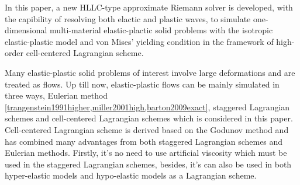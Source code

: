 \documentclass{article}
\numberwithin{equation}{section}
\numberwithin{table}{section}
\begin{document}
In this paper, a new HLLC-type approximate Riemann solver is developed, with the capibility of resolving both elactic and plastic waves, to simulate one-dimensional  multi-material elastic-plactic solid problems with the isotropic elastic-plastic model \cite{wilkins1963calculation} and von Mises' yielding condition in the framework of high-order cell-centered Lagrangian scheme. 

Many elastic-plastic solid  problems of interest involve large deformations and are treated as flows. Up till now, elastic-plastic flows can be mainly simulated in three ways, Eulerian method \ref{trangenstein1991higher,miller2001high,barton2009exact}, staggered Lagrangian schemes \cite{wilkins1963calculation} and cell-centered Lagrangian schemes \cite{burton2013cell,kluth2010discretization,maire2013nominally,cheng2017third} which is considered in this paper. 
Cell-centered Lagrangian  scheme  is derived  based on the Godunov method and has combined many advantages from both staggered Lagrangian schemes and Eulerian methods. Firstly, it's no need to use artificial viscosity  which must be used in the staggered Lagrangian schemes, besides, it's can also be used in both  hyper-elastic models and hypo-elastic models  \cite{burton2013cell,kluth2010discretization,maire2013nominally,cheng2017third}  as a Lagrangian scheme.
\end{document}
